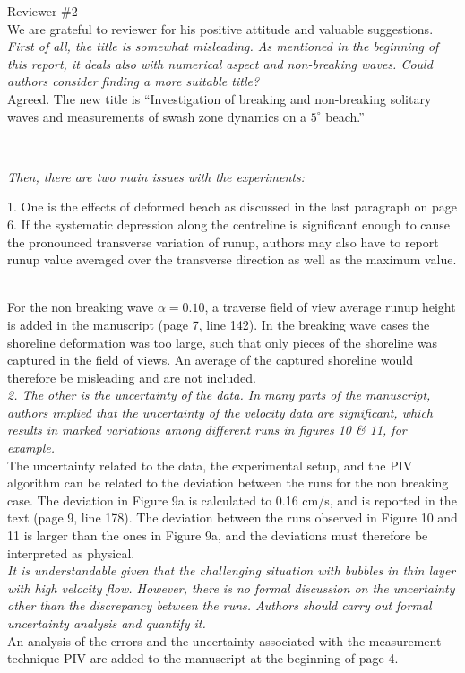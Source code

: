 \documentclass[11pt]{article}
\begin{document}
\newcommand{\refpoint}[1]{\ \vspace{0.3cm}\\ {\em #1}\  \vspace{0.3cm}\\ }
\newcommand{\todo}[1]{\ \\ {\bf To do: #1}}

Reviewer \#2
\\
We are grateful to reviewer for his positive attitude and valuable suggestions.
\refpoint{First of all, the title is somewhat misleading. As mentioned in the beginning of this report, it deals also with 
numerical aspect and non-breaking waves. Could authors consider finding a more suitable title?}
Agreed.
The new title is ``Investigation of breaking and non-breaking solitary waves and measurements of swash zone dynamics on 
a $5^\circ$ beach.''

\refpoint{Then, there are two main issues with the experiments: 

1. One is the effects of deformed beach as discussed in the last paragraph on page 6. If the systematic depression along the centreline is significant enough to cause the pronounced transverse variation of runup, authors may also have to report runup value averaged over the transverse direction as well as the maximum value.}
For the non breaking wave $\alpha =0.10$, a traverse field of view average runup height is added in the manuscript (page 7, line 142). In the breaking wave cases the shoreline deformation was too large, such that only pieces of the shoreline was captured in the field of views. An average of the captured shoreline would therefore be misleading and are not included. 
\refpoint{2. The other is the uncertainty of the data. In many parts of the manuscript, authors implied that the uncertainty of the velocity data are significant, which results in marked variations among different runs in figures 10 \& 11, for example.}
The uncertainty related to the data, the experimental setup, and the PIV algorithm can be related to the deviation between the runs for the non breaking case. The deviation in Figure 9a is calculated to 0.16 cm/s, and is reported in the text (page 9, line 178). The deviation between the runs observed in Figure 10 and 11 is larger than the ones in Figure 9a, and the deviations must therefore be interpreted as physical.
\refpoint{ It is understandable given that the challenging situation with bubbles in thin layer with high velocity flow. However, there is no formal discussion on the uncertainty other than the discrepancy between the runs. Authors should carry out formal uncertainty analysis and quantify it.}
An analysis of the errors and the uncertainty associated with the measurement technique PIV are added to the manuscript at the beginning of page 4.
\end{document}
